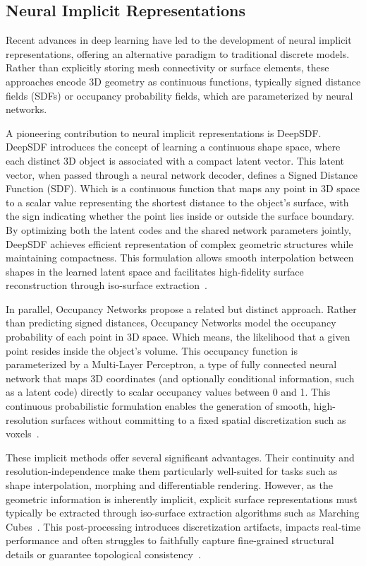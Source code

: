 \subsection{Neural Implicit Representations}

Recent advances in deep learning have led to the development of neural implicit representations, offering an alternative paradigm to traditional discrete models.  
Rather than explicitly storing mesh connectivity or surface elements, these approaches encode 3D geometry as continuous functions, typically signed distance fields (SDFs) or occupancy probability fields, which are parameterized by neural networks.  

A pioneering contribution to neural implicit representations is DeepSDF.  
DeepSDF introduces the concept of learning a continuous shape space, where each distinct 3D object is associated with a compact latent vector.  
This latent vector, when passed through a neural network decoder, defines a Signed Distance Function (SDF).  
Which is a continuous function that maps any point in 3D space to a scalar value representing the shortest distance to the object's surface, with the sign indicating whether the point lies inside or outside the surface boundary.  
By optimizing both the latent codes and the shared network parameters jointly, DeepSDF achieves efficient representation of complex geometric structures while maintaining compactness.  
This formulation allows smooth interpolation between shapes in the learned latent space and facilitates high-fidelity surface reconstruction through iso-surface extraction~\cite{park2019}.  

In parallel, Occupancy Networks propose a related but distinct approach.  
Rather than predicting signed distances, Occupancy Networks model the occupancy probability of each point in 3D space.  
Which means, the likelihood that a given point resides inside the object's volume.  
This occupancy function is parameterized by a Multi-Layer Perceptron, a type of fully connected neural network that maps 3D coordinates (and optionally conditional information, such as a latent code) directly to scalar occupancy values between 0 and 1.  
This continuous probabilistic formulation enables the generation of smooth, high-resolution surfaces without committing to a fixed spatial discretization such as voxels~\cite{mescheder2019}.  

These implicit methods offer several significant advantages.  
Their continuity and resolution-independence make them particularly well-suited for tasks such as shape interpolation, morphing and differentiable rendering.  
However, as the geometric information is inherently implicit, explicit surface representations must typically be extracted through iso-surface extraction algorithms such as Marching Cubes~\cite{lorensen1987}.  
This post-processing introduces discretization artifacts, impacts real-time performance and often struggles to faithfully capture fine-grained structural details or guarantee topological consistency~\cite{sitzmann2020}.  

